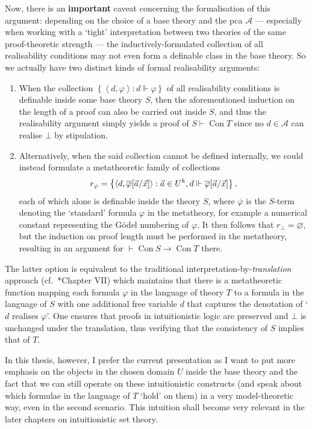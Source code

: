 \documentclass[12pt,openany]{book}
\theoremstyle{plain}
\theoremstyle{definition}
\newcommand\uplabel[1]{\textup{(#1)}}
\newcommand\tuple[1]{\left\langle #1 \right\rangle}
\DeclareMathOperator\Con{Con}
\begin{document}
Now, there is an \textbf{important} caveat\label{loc:real-con-def-caveat} concerning the formalisation of this argument: depending on the choice of a base theory and the pca $\mathcal{A}$ --- especially when working with a `tight' interpretation between two theories of the same proof-theoretic strength --- the inductively-formulated collection of all realisability conditions may not even form a definable class in the base theory. So we actually have two distinct kinds of formal realisability arguments:
\begin{enumerate}[label=\uplabel{\alph*}]
  \item When the collection $\left\{\tuple{d, \varphi} : d \Vdash \varphi\right\}$ of all realisability conditions is definable inside some base theory $S$, then the aforementioned induction on the length of a proof can also be carried out inside $S$, and thus the realisability argument simply yields a proof of $S \vdash \Con T$ since no $d \in \mathcal{A}$ can realise $\bot$ by stipulation.
  \item Alternatively, when the said collection cannot be defined internally, we could instead formulate a metatheoretic family of collections
        \[r_\varphi = \left\{\tuple{d, \overline{\varphi}\mleft[\vec{a}/\vec{x}\mright]} : \vec{a} \in U^k, d \Vdash \overline{\varphi}\mleft[\vec{a}/\vec{x}\mright]\right\},\]
        each of which alone is definable inside the theory $S$, where $\overline{\varphi}$ is the $S$-term denoting the `standard' formula $\varphi$ in the metatheory, for example a numerical constant representing the G\"odel numbering of $\varphi$. It then follows that $r_\bot = \varnothing$, but the induction on proof length must be performed in the metatheory, resulting in an argument for $\vdash \Con S \rightarrow \Con T$ there.
\end{enumerate}

The latter option is equivalent to the traditional interpretation-by-\emph{translation} approach (cf.\ \cite{beeson85-constructive-maths}*{Chapter VII}) which maintains that there is a metatheoretic function mapping each formula $\varphi$ in the language of theory $T$ to a formula in the language of $S$ with one additional free variable $d$ that captures the denotation of `$d$ realises $\varphi$'. One ensures that proofs in intuitionistic logic are preserved and $\bot$ is unchanged under the translation, thus verifying that the consistency of $S$ implies that of $T$.

In this thesis, however, I prefer the current presentation as I want to put more emphasis on the objects in the chosen domain $U$ inside the base theory and the fact that we can still operate on these intuitionistic constructs (and speak about which formulae in the language of $T$ `hold' on them) in a very model-theoretic way, even in the second scenario. This intuition shall become very relevant in the later chapters on intuitionistic set theory.
\end{document}
